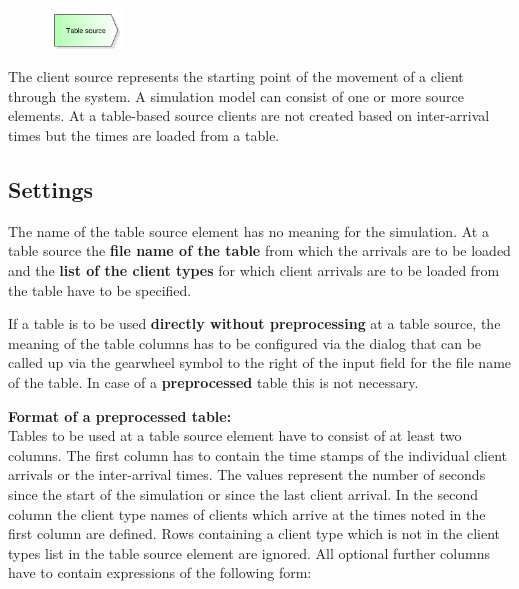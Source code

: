 \begin{figure}
\vspace{-22pt}
\includegraphics[width=2cm]{imageModelElementSourceTable.png}
\vspace{-22pt}
\end{figure}

The client source represents the starting point of the movement of a client through the system.
A simulation model can consist of one or more source elements.
At a table-based source clients are not created based on inter-arrival times but the
times are loaded from a table.

\subsection*{Settings}

The name of the table source element has no meaning for the simulation.
At a table source the \textbf{file name of the table} from which the arrivals
are to be loaded and the \textbf{list of the client types} for which client
arrivals are to be loaded from the table have to be specified.

If a table is to be used \textbf{directly without preprocessing} at a table source, 
the meaning of the table columns has to be configured via the dialog that can be
called up via the gearwheel symbol to the right of the input field
for the file name of the table. In case of a \textbf{preprocessed} table this is not necessary.

\textbf{Format of a preprocessed table:}~\\
Tables to be used at a table source element have to consist of at least two columns.
The first column has to contain the time stamps of the individual client arrivals
or the inter-arrival times. The values represent the number of seconds since the
start of the simulation or since the last client arrival.
In the second column the client type names of clients which arrive at the times
noted in the first column are defined. Rows containing a client type which is
not in the client types list in the table source element are ignored.
All optional further columns have to contain expressions of the following form:

